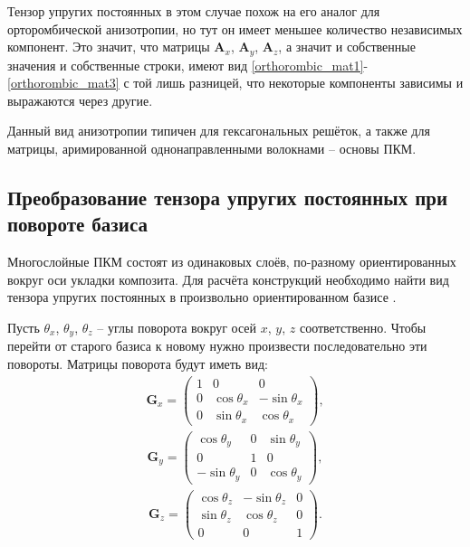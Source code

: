 	Тензор упругих постоянных в этом случае похож на его аналог для орторомбической анизотропии, но тут он имеет меньшее количество независимых компонент.
	Это значит, что матрицы $\mathbf{A}_x$, $\mathbf{A}_y$, $\mathbf{A}_z$, а значит и собственные значения и собственные строки, имеют вид \eqref{orthorombic_mat1}-\eqref{orthorombic_mat3} с той лишь разницей, что некоторые компоненты зависимы и выражаются через другие.
	
	Данный вид анизотропии типичен для гексагональных решёток, а также для матрицы, аримированной однонаправленными волокнами -- основы ПКМ.
	
\subsection{Преобразование тензора упругих постоянных при повороте базиса}
	
	Многослойные ПКМ состоят из одинаковых слоёв, по-разному ориентированных вокруг оси укладки композита.
	Для расчёта конструкций необходимо найти вид тензора упругих постоянных в произвольно ориентированном базисе \cite{favorskaya}.
	
	Пусть $\theta_{x}$, $\theta_{y}$, $\theta_{z}$ -- углы поворота вокруг осей $x$, $y$, $z$ соответственно. 
	Чтобы перейти от старого базиса к новому нужно произвести последовательно эти повороты.
	Матрицы поворота будут иметь вид:
\begin{align}
\label{rotation_mat1}
\mathbf{G}_x =
\left( \begin{array}{cccccccccccc}
1 & 0 & 0 \\ 
0 & \cos \theta_{x} & -\sin \theta_{x} \\ 
0 & \sin \theta_{x} & \cos \theta_{x}
\end{array} \right),
\end{align} 
\begin{align}
\label{rotation_mat2}
\mathbf{G}_y =
\left( \begin{array}{cccccccccccc}
\cos \theta_{y} & 0 & \sin \theta_{y} \\
0 & 1 & 0 \\ 
-\sin \theta_{y} & 0 & \cos \theta_{y} 
\end{array} \right),
\end{align}
\begin{align}
\label{rotation_mat3}
\mathbf{G}_z =
\left( \begin{array}{cccccccccccc}
\cos \theta_{z} & -\sin \theta_{z} & 0 \\ 
\sin \theta_{z} & \cos \theta_{z} & 0 \\  
0 & 0 & 1  
\end{array} \right).
\end{align}
	
